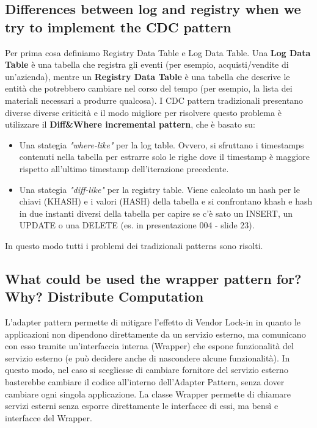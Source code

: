 \documentclass{article}
\begin{document}
\subsection{Differences between log and registry when we try to implement the CDC pattern}
Per prima cosa definiamo Registry Data Table e Log Data Table. Una \textbf{Log Data Table} è una tabella che registra gli eventi (per esempio, acquisti/vendite di un'azienda), mentre un \textbf{Registry Data Table} è una tabella che descrive le entità che potrebbero cambiare nel corso del tempo (per esempio, la lista dei materiali necessari a produrre qualcosa).
I CDC pattern tradizionali presentano diverse diverse criticità e il modo migliore per risolvere questo problema è utilizzare il \textbf{Diff\&Where incremental pattern}, che è basato su:
\begin{itemize}
    \item Una stategia \textit{"where-like"} per la log table. Ovvero, si sfruttano i timestamps contenuti nella tabella per estrarre solo le righe dove il timestamp è maggiore rispetto all'ultimo timestamp dell'iterazione precedente.
    \item Una stategia \textit{"diff-like"} per la registry table. Viene calcolato un hash per le chiavi (KHASH) e i valori (HASH) della tabella e si confrontano khash e hash in due instanti diversi della tabella per capire se c'è sato un INSERT, un UPDATE o una DELETE (es. in presentazione 004 - slide 23).
\end{itemize}
In questo modo tutti i problemi dei tradizionali patterns sono risolti.

\subsection{What could be used the wrapper pattern for? Why?
Distribute Computation}
L’adapter pattern permette di mitigare l’effetto di Vendor Lock-in in quanto le applicazioni non dipendono direttamente da un servizio esterno, ma comunicano con esso tramite un'interfaccia interna (Wrapper) che espone funzionalità del servizio esterno (e può decidere anche di nascondere alcune funzionalità). In questo modo, nel caso si scegliesse di cambiare fornitore del servizio esterno basterebbe cambiare il codice all'interno dell'Adapter Pattern, senza dover cambiare ogni singola applicazione.
La classe Wrapper permette di chiamare servizi esterni senza esporre direttamente le interfacce di essi, ma bensì e interfacce del Wrapper.
\end{document}
